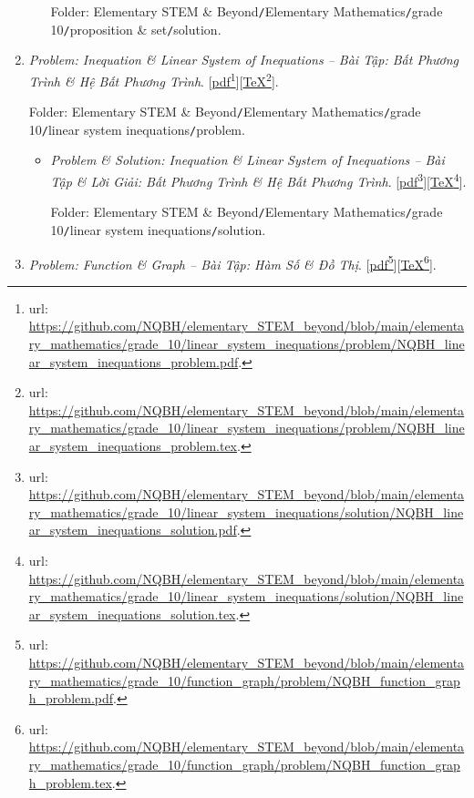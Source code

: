 \documentclass[12pt,oneside]{book}
\begin{document}
\begin{enumerate}
\begin{itemize}
		Folder: {\sf Elementary STEM \& Beyond{\tt/}Elementary Mathematics{\tt/}grade 10{\tt/}proposition \& set{\tt/}solution}.
	\end{itemize}
	\item {\it Problem: Inequation \& Linear System of Inequations -- Bài Tập: Bất Phương Trình \& Hệ Bất Phương Trình}. [\href{https://github.com/NQBH/elementary_STEM_beyond/blob/main/elementary_mathematics/grade_10/linear_system_inequations/problem/NQBH_linear_system_inequations_problem.pdf}{pdf}\footnote{{\sc url}: \url{https://github.com/NQBH/elementary_STEM_beyond/blob/main/elementary_mathematics/grade_10/linear_system_inequations/problem/NQBH_linear_system_inequations_problem.pdf}.}][\href{https://github.com/NQBH/elementary_STEM_beyond/blob/main/elementary_mathematics/grade_10/linear_system_inequations/problem/NQBH_linear_system_inequations_problem.tex}{\TeX}\footnote{{\sc url}: \url{https://github.com/NQBH/elementary_STEM_beyond/blob/main/elementary_mathematics/grade_10/linear_system_inequations/problem/NQBH_linear_system_inequations_problem.tex}.}].
	
	Folder: {\sf Elementary STEM \& Beyond{\tt/}Elementary Mathematics{\tt/}grade 10{\tt/}linear system inequations{\tt/}problem}.
	\begin{itemize}
		\item {\it Problem \& Solution: Inequation \& Linear System of Inequations -- Bài Tập \& Lời Giải: Bất Phương Trình \& Hệ Bất Phương Trình}. [\href{https://github.com/NQBH/elementary_STEM_beyond/blob/main/elementary_mathematics/grade_10/linear_system_inequations/solution/NQBH_linear_system_inequations_solution.pdf}{pdf}\footnote{{\sc url}: \url{https://github.com/NQBH/elementary_STEM_beyond/blob/main/elementary_mathematics/grade_10/linear_system_inequations/solution/NQBH_linear_system_inequations_solution.pdf}.}][\href{https://github.com/NQBH/elementary_STEM_beyond/blob/main/elementary_mathematics/grade_10/linear_system_inequations/solution/NQBH_linear_system_inequations_solution.tex}{\TeX}\footnote{{\sc url}: \url{https://github.com/NQBH/elementary_STEM_beyond/blob/main/elementary_mathematics/grade_10/linear_system_inequations/solution/NQBH_linear_system_inequations_solution.tex}.}].
		
		Folder: {\sf Elementary STEM \& Beyond{\tt/}Elementary Mathematics{\tt/}grade 10{\tt/}linear system inequations{\tt/}solution}.
	\end{itemize}
	\item {\it Problem: Function \& Graph  -- Bài Tập: Hàm Số \& Đồ Thị}. [\href{https://github.com/NQBH/elementary_STEM_beyond/blob/main/elementary_mathematics/grade_10/function_graph/problem/NQBH_function_graph_problem.pdf}{pdf}\footnote{{\sc url}: \url{https://github.com/NQBH/elementary_STEM_beyond/blob/main/elementary_mathematics/grade_10/function_graph/problem/NQBH_function_graph_problem.pdf}.}][\href{https://github.com/NQBH/elementary_STEM_beyond/blob/main/elementary_mathematics/grade_10/function_graph/problem/NQBH_function_graph_problem.tex}{\TeX}\footnote{{\sc url}: \url{https://github.com/NQBH/elementary_STEM_beyond/blob/main/elementary_mathematics/grade_10/function_graph/problem/NQBH_function_graph_problem.tex}.}].
	

\end{enumerate}
\end{document}
